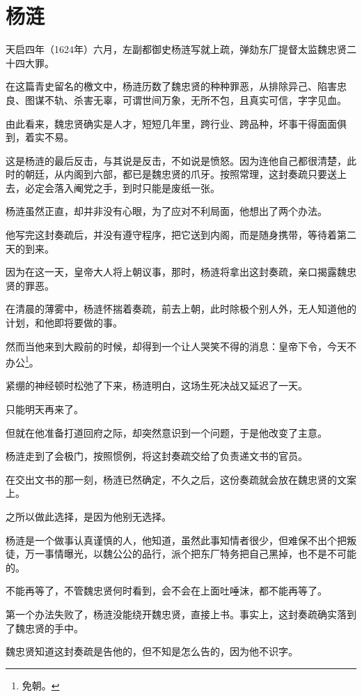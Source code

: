 \section{杨涟}
\ifnum{}
	\begin{multicols}{\theparacolNo}
\fi
天启四年（1624年）六月，左副都御史杨涟写就上疏，弹劾东厂提督太监魏忠贤二十四大罪。

在这篇青史留名的檄文中，杨涟历数了魏忠贤的种种罪恶，从排除异己、陷害忠良、图谋不轨、杀害无辜，可谓世间万象，无所不包，且真实可信，字字见血。

由此看来，魏忠贤确实是人才，短短几年里，跨行业、跨品种，坏事干得面面俱到，着实不易。

这是杨涟的最后反击，与其说是反击，不如说是愤怒。因为连他自己都很清楚，此时的朝廷，从内阁到六部，都已是魏忠贤的爪牙。按照常理，这封奏疏只要送上去，必定会落入阉党之手，到时只能是废纸一张。

杨涟虽然正直，却并非没有心眼，为了应对不利局面，他想出了两个办法。

他写完这封奏疏后，并没有遵守程序，把它送到内阁，而是随身携带，等待着第二天的到来。

因为在这一天，皇帝大人将上朝议事，那时，杨涟将拿出这封奏疏，亲口揭露魏忠贤的罪恶。

在清晨的薄雾中，杨涟怀揣着奏疏，前去上朝，此时除极个别人外，无人知道他的计划，和他即将要做的事。

然而当他来到大殿前的时候，却得到一个让人哭笑不得的消息：皇帝下令，今天不办公\footnote{免朝。}。

紧绷的神经顿时松弛了下来，杨涟明白，这场生死决战又延迟了一天。

只能明天再来了。

但就在他准备打道回府之际，却突然意识到一个问题，于是他改变了主意。

杨涟走到了会极门，按照惯例，将这封奏疏交给了负责递文书的官员。

在交出文书的那一刻，杨涟已然确定，不久之后，这份奏疏就会放在魏忠贤的文案上。

之所以做此选择，是因为他别无选择。

杨涟是一个做事认真谨慎的人，他知道，虽然此事知情者很少，但难保不出个把叛徒，万一事情曝光，以魏公公的品行，派个把东厂特务把自己黑掉，也不是不可能的。

不能再等了，不管魏忠贤何时看到，会不会在上面吐唾沫，都不能再等了。

第一个办法失败了，杨涟没能绕开魏忠贤，直接上书。事实上，这封奏疏确实落到了魏忠贤的手中。

魏忠贤知道这封奏疏是告他的，但不知是怎么告的，因为他不识字。


\end{multicols}
